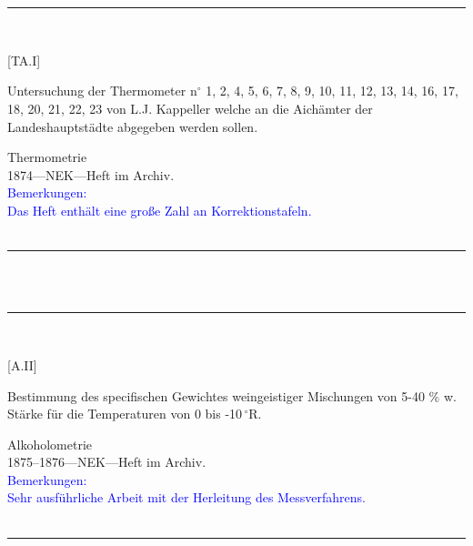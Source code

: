 \\
\vspace*{-2.5pt}\\
\parbox{\textwidth}{%
\rule{\textwidth}{1pt}\vspace*{-3mm}\\
\begin{minipage}[t]{0.22\textwidth}\vspace{0pt}
\Huge\rule[-4mm]{0cm}{1cm}[TA.I]
\end{minipage}
\hfill
\begin{minipage}[t]{0.78\textwidth}\vspace{0pt}
\large Untersuchung der Thermometer n{$^\circ$} 1, 2, 4, 5, 6, 7, 8, 9, 10, 11, 12, 13, 14, 16, 17, 18, 20, 21, 22, 23 von L.J. Kappeller welche an die Aichämter der Landeshauptstädte abgegeben werden sollen.\rule[-2mm]{0mm}{2mm}
\end{minipage}
{\footnotesize\flushright
Thermometrie\\
}
1874\quad---\quad NEK\quad---\quad Heft im Archiv.\\
\textcolor{blue}{Bemerkungen:\\{}
Das Heft enthält eine große Zahl an Korrektionstafeln.\\{}
}
\\[-15pt]
\rule{\textwidth}{1pt}
}
\\
\vspace*{-2.5pt}\\
\parbox{\textwidth}{%
\rule{\textwidth}{1pt}\vspace*{-3mm}\\
\begin{minipage}[t]{0.22\textwidth}\vspace{0pt}
\Huge\rule[-4mm]{0cm}{1cm}[A.II]
\end{minipage}
\hfill
\begin{minipage}[t]{0.78\textwidth}\vspace{0pt}
\large Bestimmung des specifischen Gewichtes weingeistiger Mischungen von 5-40 \%{} w. Stärke für die Temperaturen von 0 bis -10\,{$^\circ$}R.\rule[-2mm]{0mm}{2mm}
\end{minipage}
{\footnotesize\flushright
Alkoholometrie\\
}
1875--1876\quad---\quad NEK\quad---\quad Heft im Archiv.\\
\textcolor{blue}{Bemerkungen:\\{}
Sehr ausführliche Arbeit mit der Herleitung des Messverfahrens.\\{}
}
\\[-15pt]
\rule{\textwidth}{1pt}
}
